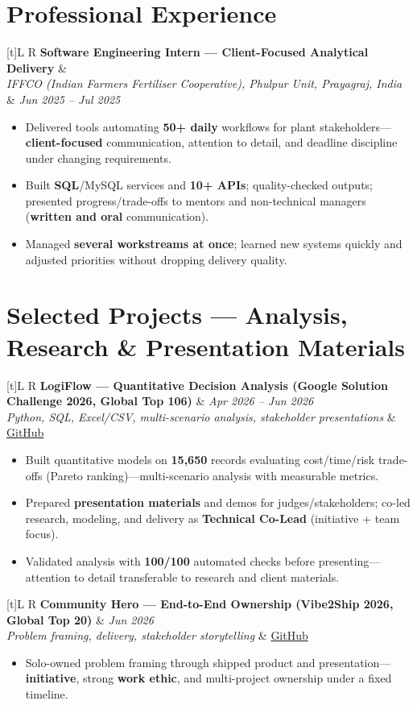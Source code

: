 \documentclass[a4paper,10pt]{article}
\newcommand{\resumeSubheading}[4]{%
  \vspace{0.25mm}
  \noindent
  \begin{tabularx}{\textwidth}[t]{L R}
    \textbf{#1} & #4 \\
    \textit{#3} & \textit{#2} \\
  \end{tabularx}
  \vspace{-0.25mm}%
}
\newcommand{\resumeProject}[4]{%
  \vspace{0.25mm}
  \noindent
  \begin{tabularx}{\textwidth}[t]{L R}
    \textbf{#1} & \textit{#3} \\
    \textit{#2} & #4 \\
  \end{tabularx}
  \vspace{-0.25mm}%
}
\begin{document}
\section{Professional Experience}
\small
\resumeSubheading
  {Software Engineering Intern --- Client-Focused Analytical Delivery}{Jun 2025 -- Jul 2025}
  {IFFCO (Indian Farmers Fertiliser Cooperative), Phulpur Unit, Prayagraj, India}{}
\begin{itemize}
  \item Delivered tools automating \textbf{50+ daily} workflows for plant stakeholders---\textbf{client-focused} communication, attention to detail, and deadline discipline under changing requirements.
  \item Built \textbf{SQL}/MySQL services and \textbf{10+ APIs}; quality-checked outputs; presented progress/trade-offs to mentors and non-technical managers (\textbf{written and oral} communication).
  \item Managed \textbf{several workstreams at once}; learned new systems quickly and adjusted priorities without dropping delivery quality.
\end{itemize}

\section{Selected Projects --- Analysis, Research \& Presentation Materials}
\small

\resumeProject
  {LogiFlow --- Quantitative Decision Analysis (Google Solution Challenge 2026, Global Top 106)}
  {Python, SQL, Excel/CSV, multi-scenario analysis, stakeholder presentations}
  {Apr 2026 -- Jun 2026}
  {\href{https://github.com/Ojas-Srivastava05/LogiFlow-Solution-Challenge-2026}{GitHub}}
\begin{itemize}
  \item Built quantitative models on \textbf{15,650} records evaluating cost/time/risk trade-offs (Pareto ranking)---multi-scenario analysis with measurable metrics.
  \item Prepared \textbf{presentation materials} and demos for judges/stakeholders; co-led research, modeling, and delivery as \textbf{Technical Co-Lead} (initiative + team focus).
  \item Validated analysis with \textbf{100/100} automated checks before presenting---attention to detail transferable to research and client materials.
\end{itemize}

\resumeProject
  {Community Hero --- End-to-End Ownership (Vibe2Ship 2026, Global Top 20)}
  {Problem framing, delivery, stakeholder storytelling}
  {Jun 2026}
  {\href{https://github.com/Ojas-Srivastava05/community-hero}{GitHub}}
\begin{itemize}
  \item Solo-owned problem framing through shipped product and presentation---\textbf{initiative}, strong \textbf{work ethic}, and multi-project ownership under a fixed timeline.
\end{itemize}
\end{document}
